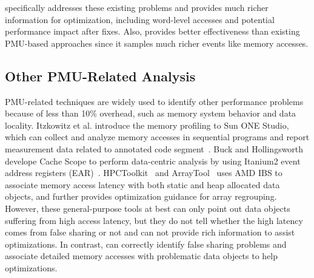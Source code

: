 \cheetah{} specifically addresses these existing problems
and provides much richer information for optimization, including word-level accesses and potential performance impact after fixes. Also, \Cheetah{} provides better effectiveness than existing PMU-based approaches since it samples much richer events like memory accesses. 


\subsection{Other PMU-Related Analysis}

PMU-related techniques are widely used to identify other performance problems because of less than 10\% overhead, such as memory system behavior and data locality. Itzkowitz et al. introduce the memory profiling to Sun ONE Studio, which can collect and analyze memory accesses in sequential programs and report measurement data related to annotated code segment~\cite{DBLP:conf/sc/ItzkowitzWAK03}. Buck and Hollingsworth develope Cache Scope to perform data-centric analysis by using Itanium2 event address registers (EAR)~\cite{DBLP:conf/sc/BuckH04}. HPCToolkit~\cite{ibs-sc} and ArrayTool~\cite{ibs-pact} uses AMD IBS to associate memory access latency with both static and heap allocated data objects, and further provides optimization guidance for array regrouping. However, these general-purpose tools at best can only point out data objects suffering from high access latency, but they do not tell whether the high latency comes from false sharing or not and can not provide rich information to assist optimizations. In contrast, \cheetah{} can correctly identify false sharing problems and associate detailed memory accesses with problematic data objects to help optimizations.




